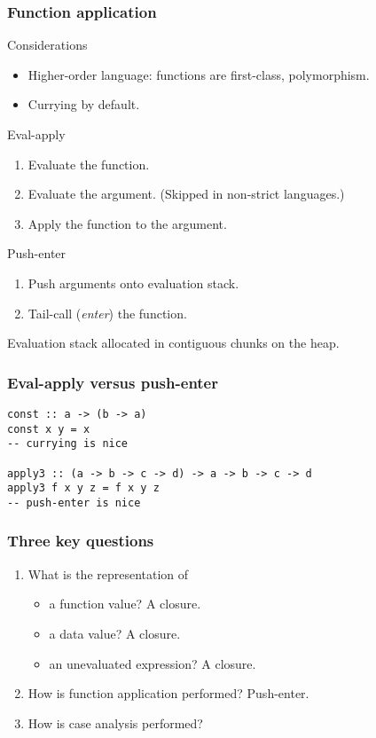 \documentclass{beamer}
\begin{document}
\begin{frame}
    \frametitle{Function application}
    \begin{block}{Considerations}
        \begin{itemize}
            \item
                Higher-order language: functions are first-class, polymorphism.
            \item
                Currying by default.
        \end{itemize}
    \end{block}
    \begin{block}{Eval-apply}
        \begin{enumerate}
            \item Evaluate the function.
            \item Evaluate the argument. (Skipped in non-strict languages.)
            \item Apply the function to the argument.
        \end{enumerate}
    \end{block}
    \begin{block}{Push-enter}
        \begin{enumerate}
            \item Push arguments onto evaluation stack.
            \item Tail-call (\emph{enter}) the function.
        \end{enumerate}
        Evaluation stack allocated in contiguous chunks on the heap.
    \end{block}
\end{frame}

\begin{frame}[fragile]
    \frametitle{Eval-apply versus push-enter}
    \begin{lstlisting}
const :: a -> (b -> a)
const x y = x
-- currying is nice

apply3 :: (a -> b -> c -> d) -> a -> b -> c -> d
apply3 f x y z = f x y z
-- push-enter is nice
    \end{lstlisting}
\end{frame}

\begin{frame}
    \frametitle{Three key questions}

    \begin{enumerate}
        \item What is the representation of
            \begin{itemize}
                \item a function value? A closure.
                \item a data value? A closure.
                \item an unevaluated expression? A closure.
            \end{itemize}

        \item How is function application performed? \alert{Push-enter}.

        \item How is case analysis performed?
    \end{enumerate}
\end{frame}
\end{document}
